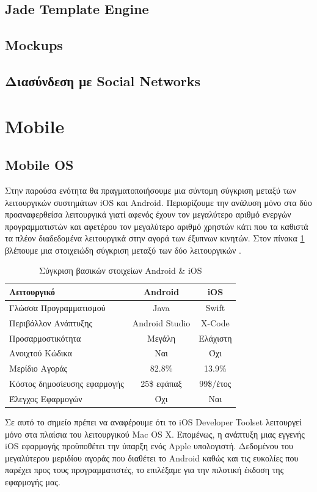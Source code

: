 		
	\subsection{Jade Template Engine}
	
	
	\subsection{Mockups}
	\subsection{Διασύνδεση με Social Networks}

\section{Mobile}
	\subsection{Mobile OS}
		Στην παρούσα ενότητα θα πραγματοποιήσουμε μια σύντομη σύγκριση μεταξύ των λειτουργικών συστημάτων iOS και Android. Περιορίζουμε την ανάλυση μόνο στα δύο προαναφερθείσα λειτουργικά γιατί αφενός έχουν τον μεγαλύτερο αριθμό ενεργών προγραμματιστών και αφετέρου τον μεγαλύτερο αριθμό χρηστών κάτι που τα καθιστά τα πλέον διαδεδομένα λειτουργικά στην αγορά των έξυπνων κινητών. Στον πίνακα \ref{tab:android_vs_ios} βλέπουμε μια στοιχειώδη σύγκριση μεταξύ των δύο λειτουργικών \cite{smartphoneMarketShare}\cite{androidPublish}\cite{applePublish}\cite{androidSource}.
		
	\begin{table}[H]
		\begin{center}
			\begin{tabular}{|l|c|c|}
			\hline
			\rowcolor{grayy}
			\textbf{Λειτουργικό} & \textbf{Android} & \textbf{iOS}
			\\ \hline
			Γλώσσα Προγραμματισμού & Java & Swift \\ \hline
			Περιβάλλον Ανάπτυξης & Android Studio & X-Code  \\ \hline
			Προσαρμοστικότητα & Μεγάλη & Ελάχιστη  \\ \hline
			Ανοιχτού Κώδικα & Ναι & Όχι  \\ \hline
			Μερίδιο Αγοράς & 82.8\% & 13.9\% \\ \hline
			Κόστος δημοσίευσης εφαρμογής & 25\$ εφάπαξ & 99\$/έτος  \\ \hline
			Έλεγχος Εφαρμογών & Όχι & Ναι \\ \hline
			\end{tabular}
			\caption{Σύγκριση βασικών στοιχείων Android \& iOS}
			\label{tab:android_vs_ios}
		\end{center}
	\end{table}
	Σε αυτό το σημείο πρέπει να αναφέρουμε ότι το iOS Developer Toolset λειτουργεί μόνο στα πλαίσια του λειτουργικού Mac OS X. Επομένως, η ανάπτυξη μιας εγγενής iOS εφαρμογής προϋποθέτει την ύπαρξη ενός Apple υπολογιστή. Δεδομένου του μεγαλύτερου μεριδίου αγοράς που διαθέτει το Android καθώς και τις ευκολίες που παρέχει προς τους προγραμματιστές, το επιλέξαμε για την πιλοτική έκδοση της εφαρμογής μας.
	
